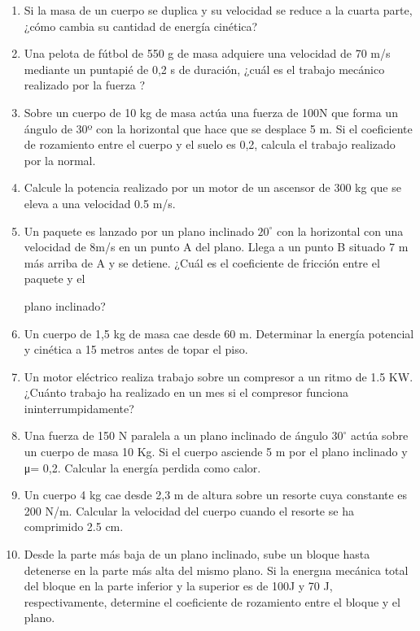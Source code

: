 \documentclass[a5paper,pagesize,10pt,bibtotoc,pointlessnumbers,
normalheadings,DIV=9,fleqn,x11names,table,twoside=false]{scrbook}
\begin{document}
\begin{enumerate}
\item  Si la masa de un cuerpo se duplica y su velocidad se reduce a la
 cuarta parte, ¿cómo cambia su cantidad de energía 
cinética?

\item  Una pelota de fútbol de 550 g de masa adquiere una
 velocidad de 70 m/s mediante un puntapié de 0,2 s de duración, ¿cuál 
es el trabajo mecánico
 realizado por la fuerza ? 

\item  Sobre un cuerpo de 10 kg de masa actúa una fuerza de
 100N que forma un ángulo de 30º con la horizontal que hace que se 
desplace 5 m. Si el
 coeficiente de rozamiento entre el cuerpo y el suelo es 0,2, calcula el trabajo realizado por
 la normal. 

\item Calcule la potencia realizado por un motor de un ascensor
 de 300 kg que se eleva a una velocidad 0.5 m/s.

\item Un paquete es lanzado por un plano inclinado $20^\circ$ con la
 horizontal con una velocidad de 8m/s en un punto A del 
plano. Llega a un punto B situado
 7 m más arriba de A y se detiene. ¿Cuál es el coeficiente de fricción entre el paquete y el

plano inclinado?

\item Un cuerpo de 1,5 kg de masa cae desde 60 m. Determinar 
la energía potencial y cinética a 15 metros antes de topar el piso.

\item  Un motor eléctrico realiza trabajo sobre un compresor a
 un ritmo de 1.5 KW. ¿Cuánto trabajo ha realizado en un mes si el 
compresor funciona
 ininterrumpidamente?

\item Una fuerza de 150 N paralela a un plano inclinado de
 ángulo $30^\circ$ actúa sobre un cuerpo de masa 10 Kg. Si el cuerpo 
asciende 5 m por el plano
 inclinado y μ= 0,2. Calcular la energía perdida como calor.

\item  Un cuerpo 4 kg cae desde 2,3 m de altura sobre un resorte
 cuya constante es 200 N/m. Calcular la velocidad del cuerpo 
cuando el resorte se ha
 comprimido 2.5 cm.

\item Desde la parte más baja de un plano inclinado, sube un
 bloque hasta detenerse en la parte más alta del mismo plano. Si la 
energııa mecánica total
 del bloque en la parte inferior y la superior es de 100J y 70 J, respectivamente, determine
 el 
coeficiente de rozamiento entre el bloque y el plano.


\end{enumerate}
\end{document}
